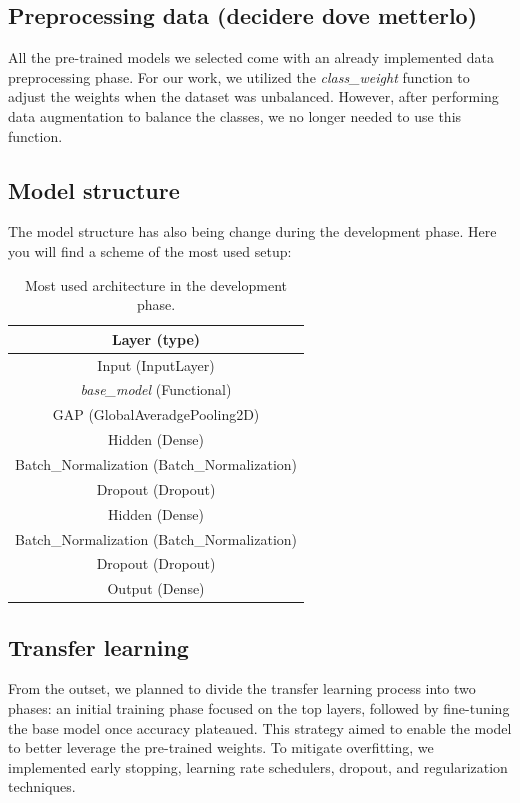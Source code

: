 \documentclass[11pt]{article}
\begin{document}
\subsection{Preprocessing data (decidere dove metterlo)}
All the pre-trained models we selected come with an already implemented data preprocessing phase. For our work, we utilized the \textit{class\_weight} function to adjust the weights when the dataset was unbalanced. However, after performing data augmentation to balance the classes, we no longer needed to use this function.
\subsection{Model structure}
The model structure has also being change during the development phase.
Here you will find a scheme of the most used setup:
\begin{table}[h!]
\centering
\begin{tabular}{|c|}
\hline
\textbf{Layer (type)} \\ \hline
Input (InputLayer)\\ \hline
\textit{base\_model} (Functional)\\ \hline
GAP (GlobalAveradgePooling2D)\\ \hline
Hidden (Dense)\\ \hline
Batch\_Normalization (Batch\_Normalization)\\ \hline
Dropout (Dropout)\\ \hline
Hidden (Dense)\\ \hline
Batch\_Normalization (Batch\_Normalization)\\ \hline
Dropout (Dropout)\\ \hline
Output (Dense)\\ \hline
\end{tabular}

\caption{Most used architecture in the development phase.}
\end{table}
\subsection{Transfer learning}
From the outset, we planned to divide the transfer learning process into two phases: an initial training phase focused on the top layers, followed by fine-tuning the base model once accuracy plateaued. This strategy aimed to enable the model to better leverage the pre-trained weights. To mitigate overfitting, we implemented early stopping, learning rate schedulers, dropout, and regularization techniques.
\end{document}
